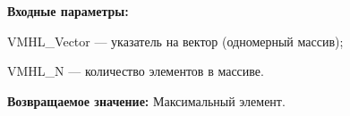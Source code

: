 \textbf{Входные параметры:}

 VMHL\_Vector --- указатель на вектор (одномерный массив);
 
 VMHL\_N --- количество элементов в массиве.

\textbf{Возвращаемое значение:}
Максимальный элемент.